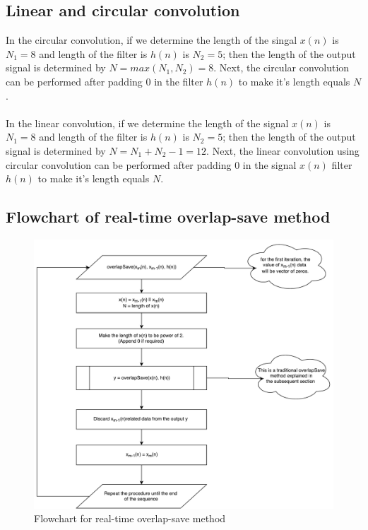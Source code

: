 \subsection*{Linear and circular convolution}
In the circular convolution, if we determine the length of the singal $x(n)$ is $N_{1} = 8$ and length of the filter is  $h(n)$ is $N_{2} = 5$; then the length of the output signal is determined by $N = max(N_{1} , N_{2} )=8$. Next, the circular convolution can be performed after padding $0$ in the filter $h(n)$ to make it's length equals $N$. \\ \\
In the linear convolution, if we determine the length of the signal $x(n)$ is $N_{1} = 8$ and length of the filter is  $h(n)$ is $N_{2} = 5$; then the length of the output signal is determined by $N = N_{1}+N_{2}-1 = 12$. Next, the linear convolution using circular convolution can be performed after padding $0$ in the signal $x(n)$ filter $h(n)$ to make it's length equals $N$.

\subsection*{Flowchart of real-time overlap-save method}
\begin{figure}[h]
	\centering
	\includegraphics[width=14cm]{./algorithms/overlap_save/figures/OS_top.pdf}
	\caption{Flowchart for real-time overlap-save method}
	\label{real-time overlap-save}
	\end{figure}

